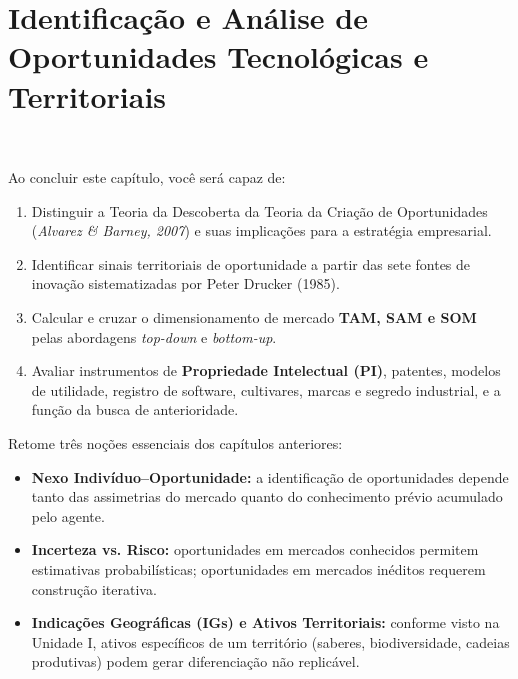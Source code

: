 \chapter{Identificação e Análise de Oportunidades Tecnológicas e Territoriais}
\label{cap:08}

\noindent\tagQuant\ \tagTerritorio

\begin{capObjetivos}
  Ao concluir este capítulo, você será capaz de:
  \begin{enumerate}[leftmargin=1.5em, itemsep=2pt]
    \item Distinguir a Teoria da Descoberta da Teoria da Criação de Oportunidades (\textit{Alvarez \& Barney, 2007}) e suas implicações para a estratégia empresarial.
    \item Identificar sinais territoriais de oportunidade a partir das sete fontes de inovação sistematizadas por Peter Drucker (1985).
    \item Calcular e cruzar o dimensionamento de mercado \textbf{TAM, SAM e SOM} pelas abordagens \textit{top-down} e \textit{bottom-up}.
    \item Avaliar instrumentos de \textbf{Propriedade Intelectual (PI)}, patentes, modelos de utilidade, registro de software, cultivares, marcas e segredo industrial, e a função da busca de anterioridade.
  \end{enumerate}
\end{capObjetivos}

\begin{capRevisao}
  Retome três noções essenciais dos capítulos anteriores:
  \begin{itemize}[leftmargin=1.5em, itemsep=2pt]
    \item \textbf{Nexo Indivíduo–Oportunidade:} a identificação de oportunidades depende tanto das assimetrias do mercado quanto do conhecimento prévio acumulado pelo agente.
    \item \textbf{Incerteza vs. Risco:} oportunidades em mercados conhecidos permitem estimativas probabilísticas; oportunidades em mercados inéditos requerem construção iterativa.
    \item \textbf{Indicações Geográficas (IGs) e Ativos Territoriais:} conforme visto na Unidade I, ativos específicos de um território (saberes, biodiversidade, cadeias produtivas) podem gerar diferenciação não replicável.
  \end{itemize}
\end{capRevisao}

